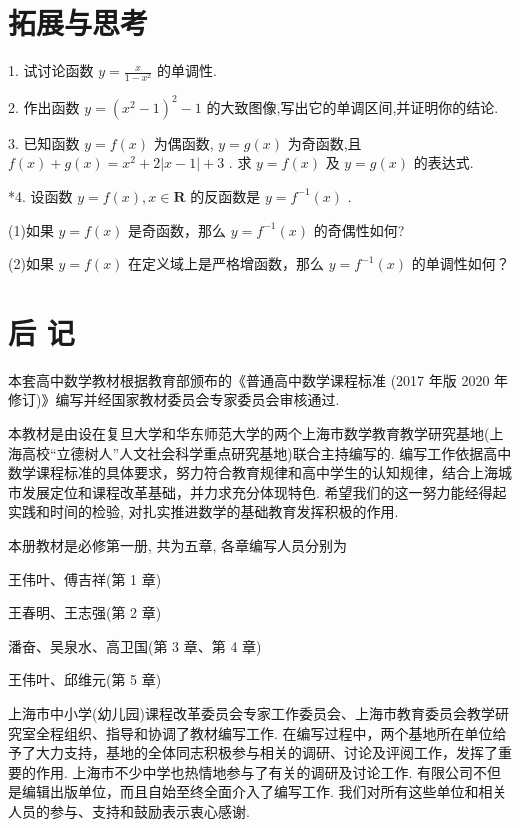\documentclass[10pt]{article}
\begin{document}
\section*{拓展与思考}

1. 试讨论函数 \(y = \frac{x}{1 - {x}^{2}}\) 的单调性.

2. 作出函数 \(y = {\left( {x}^{2} - 1\right) }^{2} - 1\) 的大致图像,写出它的单调区间,并证明你的结论.

3. 已知函数 \(y = f\left( x\right)\) 为偶函数, \(y = g\left( x\right)\) 为奇函数,且 \(f\left( x\right)  + g\left( x\right)  = {x}^{2} + 2\left| {x - 1}\right|  + 3\) . 求 \(y = f\left( x\right)\) 及 \(y = g\left( x\right)\) 的表达式.

*4. 设函数 \(y = f\left( x\right) ,x \in  \mathbf{R}\) 的反函数是 \(y = {f}^{-1}\left( x\right)\) .

(1)如果 \(y = f\left( x\right)\) 是奇函数，那么 \(y = {f}^{-1}\left( x\right)\) 的奇偶性如何?

(2)如果 \(y = f\left( x\right)\) 在定义域上是严格增函数，那么 \(y = {f}^{-1}\left( x\right)\) 的单调性如何？

\section*{后 记}

本套高中数学教材根据教育部颁布的《普通高中数学课程标准 (2017 年版 2020 年修订)》编写并经国家教材委员会专家委员会审核通过.

本教材是由设在复旦大学和华东师范大学的两个上海市数学教育教学研究基地(上海高校“立德树人”人文社会科学重点研究基地)联合主持编写的. 编写工作依据高中数学课程标准的具体要求，努力符合教育规律和高中学生的认知规律，结合上海城市发展定位和课程改革基础，并力求充分体现特色. 希望我们的这一努力能经得起实践和时间的检验, 对扎实推进数学的基础教育发挥积极的作用.

本册教材是必修第一册, 共为五章, 各章编写人员分别为

王伟叶、傅吉祥(第 1 章)

王春明、王志强(第 2 章)

潘奋、吴泉水、高卫国(第 3 章、第 4 章)

王伟叶、邱维元(第 5 章)

上海市中小学(幼儿园)课程改革委员会专家工作委员会、上海市教育委员会教学研究室全程组织、指导和协调了教材编写工作. 在编写过程中，两个基地所在单位给予了大力支持，基地的全体同志积极参与相关的调研、讨论及评阅工作，发挥了重要的作用. 上海市不少中学也热情地参与了有关的调研及讨论工作. 有限公司不但是编辑出版单位，而且自始至终全面介入了编写工作. 我们对所有这些单位和相关人员的参与、支持和鼓励表示衷心感谢.
\end{document}
